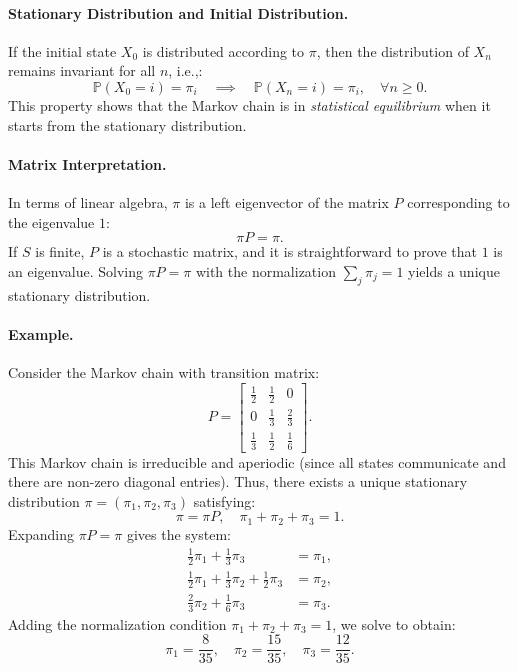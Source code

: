 \paragraph{Stationary Distribution and Initial Distribution.}  
If the initial state \( X_0 \) is distributed according to \( \pi \), then the distribution of \( X_n \) remains invariant for all \( n \), i.e.,:
\[
\mathbb{P}(X_0 = i) = \pi_i \quad \implies \quad \mathbb{P}(X_n = i) = \pi_i, \quad \forall n \geq 0.
\]
This property shows that the Markov chain is in \emph{statistical equilibrium} when it starts from the stationary distribution.

\paragraph{Matrix Interpretation.}  
In terms of linear algebra, \( \pi \) is a left eigenvector of the matrix \( P \) corresponding to the eigenvalue \( 1 \):
   \[
   \pi P = \pi.
   \]
If \( S \) is finite, \( P \) is a stochastic matrix, and it is straightforward to prove that \( 1 \) is an eigenvalue. Solving \( \pi P = \pi \) with the normalization \( \sum_{j} \pi_j = 1 \) yields a unique stationary distribution.

\paragraph{Example.}  
Consider the Markov chain with transition matrix:
\[
P = 
\begin{bmatrix}
\frac{1}{2} & \frac{1}{2} & 0 \\
0 & \frac{1}{3} & \frac{2}{3} \\
\frac{1}{3} & \frac{1}{2} & \frac{1}{6}
\end{bmatrix}.
\]
This Markov chain is irreducible and aperiodic (since all states communicate and there are non-zero diagonal entries). Thus, there exists a unique stationary distribution \( \pi = (\pi_1, \pi_2, \pi_3) \) satisfying:
\[
\pi = \pi P, \quad \pi_1 + \pi_2 + \pi_3 = 1.
\]
Expanding \( \pi P = \pi \) gives the system:
\[
\begin{aligned}
    \frac{1}{2} \pi_1 + \frac{1}{3} \pi_3 &= \pi_1, \\
    \frac{1}{2} \pi_1 + \frac{1}{3} \pi_2 + \frac{1}{2} \pi_3 &= \pi_2, \\
    \frac{2}{3} \pi_2 + \frac{1}{6} \pi_3 &= \pi_3.
\end{aligned}
\]
Adding the normalization condition \( \pi_1 + \pi_2 + \pi_3 = 1 \), we solve to obtain:
\[
\pi_1 = \frac{8}{35}, \quad \pi_2 = \frac{15}{35}, \quad \pi_3 = \frac{12}{35}.
\]

